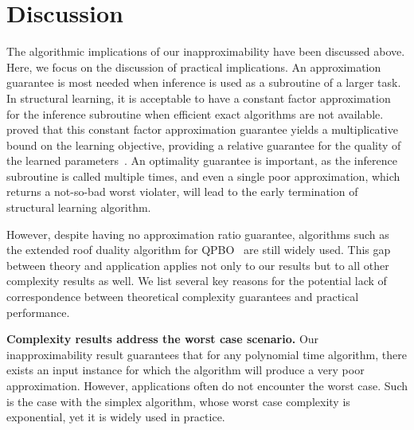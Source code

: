 \section{Discussion}\label{sec:discussion}

The algorithmic implications of our inapproximability have been discussed above. Here, we focus on the discussion of practical implications. 
An approximation guarantee is most needed when inference is used as a subroutine of a larger task. In structural learning, it is acceptable to have a constant factor approximation for the inference subroutine when efficient exact algorithms are not available. \citeauthor{finley2008training} proved that this constant factor approximation guarantee yields a multiplicative bound on the learning objective, providing a relative guarantee for the quality of the learned parameters~\cite{finley2008training}. An optimality guarantee is important, as the inference subroutine is called multiple times, and even a single poor approximation, which returns a not-so-bad worst violater, will lead to the early termination of structural learning algorithm. 

However, despite having no approximation ratio guarantee, algorithms such as the extended roof duality algorithm for QPBO~\cite{rother2007optimizing} are still widely used. This gap between theory and application applies not only to our results but to all other complexity results as well. We list several key reasons for the potential lack of correspondence between theoretical complexity guarantees and practical performance.

\textbf{Complexity results address the worst case scenario.} Our inapproximability result guarantees that for any polynomial time algorithm, there exists an input instance for which the algorithm will produce a very poor approximation. However, applications often do not encounter the worst case. Such is the case with the simplex algorithm, whose worst case complexity is exponential, yet it is widely used in practice. 


